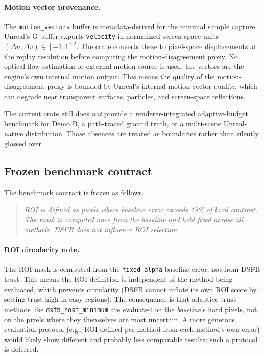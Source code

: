 \documentclass[11pt]{article}
\theoremstyle{definition}
\theoremstyle{plain}
\begin{document}
\paragraph{Motion vector provenance.}
The \texttt{motion\_vectors} buffer is metadata-derived for the minimal sample capture. Unreal's G-buffer exports \texttt{velocity} in normalized screen-space units $(\Delta u, \Delta v) \in [-1, 1]^2$. The crate converts these to pixel-space displacements at the replay resolution before computing the motion-disagreement proxy. No optical-flow estimation or external motion source is used; the vectors are the engine's own internal motion output. This means the quality of the motion-disagreement proxy is bounded by Unreal's internal motion vector quality, which can degrade near transparent surfaces, particles, and screen-space reflections.

The current crate still does \emph{not} provide a renderer-integrated adaptive-budget benchmark for Demo B, a path-traced ground truth, or a multi-scene Unreal-native distribution. Those absences are treated as boundaries rather than silently glossed over.

\subsection{Frozen benchmark contract}

The benchmark contract is frozen as follows.

\begin{quote}
\emph{ROI is defined as pixels where baseline error exceeds 15\% of local contrast. The mask is computed once from the baseline and held fixed across all methods. DSFB does not influence ROI selection.}
\end{quote}

\paragraph{ROI circularity note.}
The ROI mask is computed from the \texttt{fixed\_alpha} baseline error, not from DSFB trust. This means the ROI definition is independent of the method being evaluated, which prevents circularity (DSFB cannot inflate its own ROI score by setting trust high in easy regions). The consequence is that adaptive trust methods like \texttt{dsfb\_host\_minimum} are evaluated on the \emph{baseline}'s hard pixels, not on the pixels where they themselves are most uncertain. A more generous evaluation protocol (e.g., ROI defined per-method from each method's own error) would likely show different and probably less comparable results; such a protocol is deferred.
\end{document}
